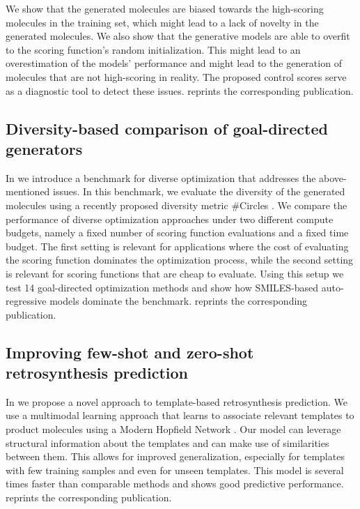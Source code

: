 We show that the generated molecules are biased towards the high-scoring molecules in the training
set, which might lead to a lack of novelty in the generated molecules. We also show that the
generative models are able to overfit to the scoring function's random initialization.
This might lead to an overestimation of the models' performance and might lead to the generation of
molecules that are not high-scoring in reality. The proposed control scores serve as a diagnostic
tool to detect these issues.  reprints the corresponding publication.

\subsection{Diversity-based comparison of goal-directed generators\label{sec:divopt}} In
\citep{renzDiverseHitsNovo2024} we introduce a benchmark for diverse optimization
that addresses the above-mentioned issues. In this benchmark, we evaluate the diversity of the
generated molecules using a recently proposed diversity metric \#Circles
\citep{xieHowMuchSpace2023}. We compare the performance of diverse optimization approaches under two
different compute budgets, namely a fixed number of scoring function evaluations and a fixed time
budget. The first setting is relevant for applications where the cost of evaluating the scoring
function dominates the optimization process, while the second setting is relevant for scoring
functions that are cheap to evaluate. Using this setup we test 14 goal-directed optimization methods
and show how SMILES-based auto-regressive models dominate the benchmark. 
reprints the corresponding publication.

\subsection{Improving few-shot and zero-shot retrosynthesis prediction}
In \citep{seidlImprovingFewZeroShot2022} we propose a novel approach to template-based
retrosynthesis prediction. We use a multimodal learning approach that learns to associate relevant
templates to product molecules using a Modern Hopfield Network
\citep{ramsauerHopfieldNetworksAll2020}. Our model can leverage structural information about the
templates and can make use of similarities between them. This allows for improved generalization,
especially for templates with few training samples and even for unseen templates. This model is
several times faster than comparable methods and shows good predictive performance.
 reprints the corresponding publication.

